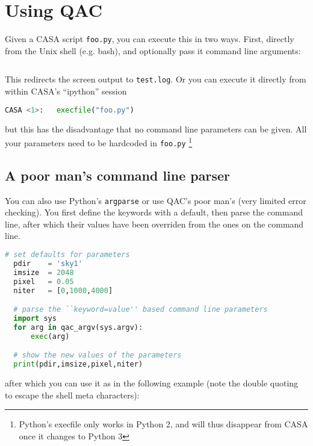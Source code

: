\documentclass[12pt,a4paper]{article}
\begin{document}
\section{Using QAC}

Given a CASA script \verb+foo.py+, you can execute this in two ways. First, directly from the Unix shell (e.g. bash), and optionally
pass it command line arguments:
 
\begin{lstlisting}[language=bash]
    % casa --nogui -c foo.py pixel=0.1 > test1.log 2>&1
\end{lstlisting}

This redirects the screen output to \verb+test.log+.  Or you can execute it directly from within CASA's ``ipython'' session

\begin{lstlisting}[language=Python]
CASA <1>:   execfile("foo.py")
\end{lstlisting}

but this has the disadvantage that no command line parameters can be given. All your parameters need to be hardcoded
in \verb+foo.py+ \footnote{Python's execfile only works in Python 2, and will thus disappear from CASA once it changes to Python 3}

\subsection{A poor man's command line parser}

You can also use Python's {\tt argparse} or use QAC's poor man's (very limited error checking).  You first define
the keywords with a default, then parse the command line, after which their values have been overriden from the ones on
the command line.

\begin{lstlisting}[language=Python]
  # set defaults for parameters
  pdir    = 'sky1'
  imsize  = 2048
  pixel   = 0.05
  niter   = [0,1000,4000]

  # parse the ``keyword=value'' based command line parameters
  import sys
  for arg in qac_argv(sys.argv):   
      exec(arg)

  # show the new values of the parameters
  print(pdir,imsize,pixel,niter)

\end{lstlisting}

after which you can use it as in the following example (note the double quoting to escape the shell meta characters):
\end{document}
